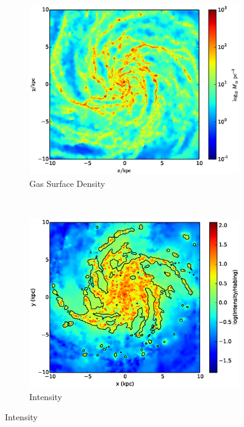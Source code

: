 \begin{figure}
        \centering
        \begin{subfigure}[b]{0.45\textwidth}
                \includegraphics[width=\textwidth]{graphics/surfacedensityRadFUV_J300200.eps}
                \caption{Gas Surface Density}
                \label{fig:op300surface}
        \end{subfigure}
        ~ 
        \begin{subfigure}[b]{0.45\textwidth}
                \includegraphics[width=\textwidth]{graphics/intensityRadFUV_J300200.eps}
                \caption{Intensity}

\end{subfigure}
\end{figure}

